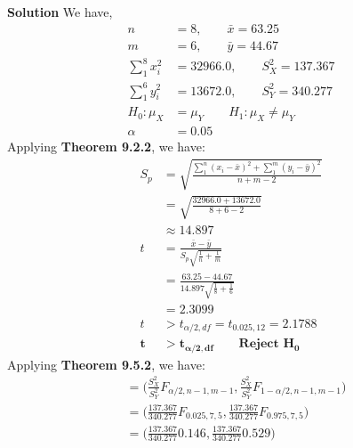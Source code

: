 \documentclass{uofa-eng-assignment}
\begin{document}
\begin{enumerate}
        \textbf{Solution}
        We have,
        \begin{align*}
            n                 & = 8, \qquad \bar{x} = 63.25          \\
            m                 & = 6, \qquad \bar{y} = 44.67          \\
            \sum_{1}^{8}x_i^2 & = 32966.0, \qquad S_X^2 = 137.367    \\
            \sum_{1}^{6}y_i^2 & = 13672.0, \qquad S_Y^2 = 340.277    \\
            H_0: \mu_X        & = \mu_Y \qquad H_1: \mu_X \neq \mu_Y \\
            \alpha            & = 0.05
        \end{align*}
        Applying \textbf{Theorem 9.2.2}, we have:
        \begin{align*}
            S_p            & = \sqrt{\frac{\sum_{1}^{n}(x_i - \bar{x})^2 + \sum_{1}^{m}(y_i - \bar{y})^2}{n+m-2}} \\
                           & = \sqrt{\frac{32966.0 + 13672.0}{8+6-2}}                                             \\
                           & \approx 14.897                                                                       \\
            t              & = \frac{\bar{x} - \bar{y}}{S_p\sqrt{\frac{1}{n} + \frac{1}{m}}}                      \\
                           & = \frac{63.25 - 44.67}{14.897\sqrt{\frac{1}{8} + \frac{1}{6}}}                       \\
                           & = 2.3099                                                                             \\
            t              & > t_{\alpha/2, df} = t_{0.025, 12} = 2.1788                                          \\
            \boldsymbol{t} & \boldsymbol{> t_{\alpha/2, df}} \qquad \textbf{Reject } \boldsymbol{H_0}
        \end{align*}
        Applying \textbf{Theorem 9.5.2}, we have:
        \begin{align*}
             & = \big( \frac{S_X^2}{S_Y^2}F_{\alpha/2, n-1, m-1}, \frac{S_X^2}{S_Y^2}F_{1-\alpha/2, n-1, m-1} \big) \\
             & = \big( \frac{137.367}{340.277}F_{0.025, 7, 5}, \frac{137.367}{340.277}F_{0.975, 7, 5} \big)         \\
             & = \big( \frac{137.367}{340.277}0.146, \frac{137.367}{340.277}0.529 \big)                             \\

\end{align*}
\end{enumerate}
\end{document}
